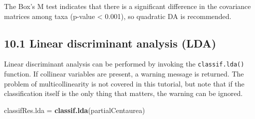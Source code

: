 \documentclass[
]{article}
\newenvironment{Shaded}{\begin{snugshade}}{\end{snugshade}}
\newcommand{\KeywordTok}[1]{\textcolor[rgb]{0.13,0.29,0.53}{\textbf{#1}}}
\newcommand{\NormalTok}[1]{#1}
\newcommand{\StringTok}[1]{\textcolor[rgb]{0.31,0.60,0.02}{#1}}
\begin{document}
The Box's M test indicates that there is a significant difference in the
covariance matrices among taxa (p-value \textless{} 0.001), so quadratic
DA is recommended.

\hypertarget{linear-discriminant-analysis-lda}{%
\subsection{10.1 Linear discriminant analysis
(LDA)}\label{linear-discriminant-analysis-lda}}

Linear discriminant analysis can be performed by invoking the
\texttt{classif.lda()} function. If collinear variables are present, a
warning message is returned. The problem of multicollinearity is not
covered in this tutorial, but note that if the classification itself is
the only thing that matters, the warning can be ignored.

\begin{Shaded}
\begin{Highlighting}[]
\NormalTok{classifRes.lda =}\StringTok{ }\KeywordTok{classif.lda}\NormalTok{(partialCentaurea)}
\end{Highlighting}
\end{Shaded}
\end{document}
